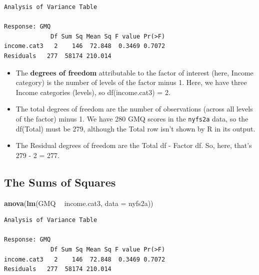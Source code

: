 \documentclass[
]{book}
\newenvironment{Shaded}{\begin{snugshade}}{\end{snugshade}}
\newcommand{\DataTypeTok}[1]{\textcolor[rgb]{0.13,0.29,0.53}{#1}}
\newcommand{\KeywordTok}[1]{\textcolor[rgb]{0.13,0.29,0.53}{\textbf{#1}}}
\newcommand{\NormalTok}[1]{#1}
\newcommand{\OperatorTok}[1]{\textcolor[rgb]{0.81,0.36,0.00}{\textbf{#1}}}
\newcommand{\StringTok}[1]{\textcolor[rgb]{0.31,0.60,0.02}{#1}}
\providecommand{\tightlist}{%
  \setlength{\itemsep}{0pt}\setlength{\parskip}{0pt}}
\begin{document}
\begin{verbatim}
Analysis of Variance Table

Response: GMQ
             Df Sum Sq Mean Sq F value Pr(>F)
income.cat3   2    146  72.848  0.3469 0.7072
Residuals   277  58174 210.014               
\end{verbatim}

\begin{itemize}
\tightlist
\item
  The \textbf{degrees of freedom} attributable to the factor of interest (here, Income category) is the number of levels of the factor minus 1. Here, we have three Income categories (levels), so df(income.cat3) = 2.
\item
  The total degrees of freedom are the number of observations (across all levels of the factor) minus 1. We have 280 GMQ scores in the \texttt{nyfs2a} data, so the df(Total) must be 279, although the Total row isn't shown by R in its output.
\item
  The Residual degrees of freedom are the Total df - Factor df. So, here, that's 279 - 2 = 277.
\end{itemize}

\hypertarget{the-sums-of-squares}{%
\subsection{The Sums of Squares}\label{the-sums-of-squares}}

\begin{Shaded}
\begin{Highlighting}[]
\KeywordTok{anova}\NormalTok{(}\KeywordTok{lm}\NormalTok{(GMQ }\OperatorTok{~}\StringTok{ }\NormalTok{income.cat3, }\DataTypeTok{data =}\NormalTok{ nyfs2a))}
\end{Highlighting}
\end{Shaded}

\begin{verbatim}
Analysis of Variance Table

Response: GMQ
             Df Sum Sq Mean Sq F value Pr(>F)
income.cat3   2    146  72.848  0.3469 0.7072
Residuals   277  58174 210.014               
\end{verbatim}
\end{document}
